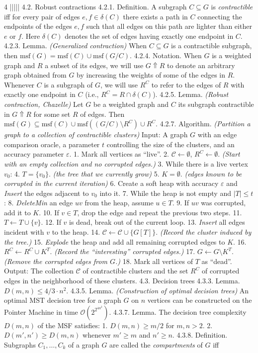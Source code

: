 \documentclass[8pt]{extarticle}
\begin{document}
\begin{multicols*}{4}
|||||
{4.2. Robust contractions} {4.2.1. Definition.} A subgraph $C \subseteq G$ is \textit{contractible} iff for every pair of edges $e, f \in \delta(C)$ there exists a path in $C$ connecting the endpoints of the edges $e, f$ such that all edges on this path are lighter than either $e$ or $f$. Here $\delta(C)$ denotes the set of edges having exactly one endpoint in $C$. {4.2.3. Lemma.} \textit{(Generalized contraction)} When $C \subseteq G$ is a contractible subgraph, then $\mathrm{msf}(G) = \mathrm{msf}(C) \cup \mathrm{msf}(G/C)$. {4.2.4. Notation.} When $G$ is a weighted graph and $R$ a subset of its edges, we will use $G \Uparrow R$ to denote an arbitrary graph obtained from $G$ by increasing the weights of some of the edges in $R$. Whenever $C$ is a subgraph of $G$, we will use $R^C$ to refer to the edges of $R$ with exactly one endpoint in $C$ (i.e., $R^C = R \cap \delta(C)$). {4.2.5. Lemma.} \textit{(Robust contraction, Chazelle)} Let $G$ be a weighted graph and $C$ its subgraph contractible in $G \Uparrow R$ for some set $R$ of edges. Then $\mathrm{msf}(G) \subseteq \mathrm{msf}(C) \cup \mathrm{msf}((G/C) \setminus R^C) \cup R^C$. {4.2.7. Algorithm.} \textit{(Partition a graph to a collection of contractible clusters)} Input: A graph $G$ with an edge comparison oracle, a parameter $t$ controlling the size of the clusters, and an accuracy parameter $\varepsilon$. 1. Mark all vertices as ``live''. 2. $\mathcal{C} \leftarrow \emptyset$, $R^C \leftarrow \emptyset$. \textit{(Start with an empty collection and no corrupted edges.)} 3. While there is a live vertex $v_0$: 4. $T = \{v_0\}$. \textit{(the tree that we currently grow)} 5. $K = \emptyset$. \textit{(edges known to be corrupted in the current iteration)} 6. Create a soft heap with accuracy $\varepsilon$ and \textit{Insert} the edges adjacent to $v_0$ into it. 7. While the heap is not empty and $|T| \le t$: 8. \textit{DeleteMin} an edge $uv$ from the heap, assume $u \in T$. 9. If $uv$ was corrupted, add it to $K$. 10. If $v \in T$, drop the edge and repeat the previous two steps. 11. $T \leftarrow T \cup \{v\}$. 12. If $v$ is dead, break out of the current loop. 13. \textit{Insert} all edges incident with $v$ to the heap. 14. $\mathcal{C} \leftarrow \mathcal{C} \cup \{G[T]\}$. \textit{(Record the cluster induced by the tree.)} 15. \textit{Explode} the heap and add all remaining corrupted edges to $K$. 16. $R^C \leftarrow R^C \cup K^T$. \textit{(Record the ``interesting'' corrupted edges.)} 17. $G \leftarrow G \setminus K^T$. \textit{(Remove the corrupted edges from $G$.)} 18. Mark all vertices of $T$ as ``dead''. Output: The collection $\mathcal{C}$ of contractible clusters and the set $R^C$ of corrupted edges in the neighborhood of these clusters. {4.3. Decision trees} {4.3.3. Lemma.} $D(m,n) \le 4/3 \cdot n^2$. {4.3.5. Lemma.} \textit{(Construction of optimal decision trees)} An optimal MST decision tree for a graph $G$ on $n$ vertices can be constructed on the Pointer Machine in time $\mathcal{O}(2^{2^{4n^2}})$. {4.3.7. Lemma.} The decision tree complexity $D(m,n)$ of the MSF satisfies: 1. $D(m,n) \ge m/2$ for $m,n > 2$. 2. $D(m',n') \ge D(m,n)$ whenever $m' \ge m$ and $n' \ge n$. {4.3.8. Definition.} Subgraphs $C_1, \dots, C_k$ of a graph $G$ are called the \textit{compartments} of $G$ iff 
\end{multicols*}
\end{document}
